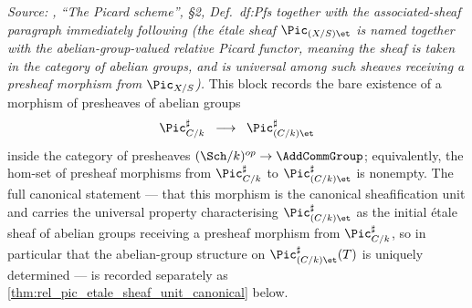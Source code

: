 \begin{theorem}\leanok
  \label{thm:rel_pic_etale_sheaf_group_structure}

  \textit{Source: \cite{kleiman-picard}, ``The Picard scheme'', \S 2,
  Def.~df:Pfs together with the associated-sheaf paragraph immediately
  following (the \'etale sheaf \(\Pic_{(X/S)\et}\) is named together with the
  abelian-group-valued relative Picard functor, meaning the sheaf is taken in
  the category of abelian groups, and is universal among such sheaves
  receiving a presheaf morphism from \(\Pic_{X/S}\)).}
  This block records the bare existence of a morphism of presheaves of
  abelian groups
  \[
    \Pic^\sharp_{C/k} \;\;\longrightarrow\;\;
    \Pic^\sharp_{(C/k)\et}
  \]
  inside the category of presheaves
  \((\Sch/k)^{op} \to \AddCommGroup\); equivalently, the hom-set of
  presheaf morphisms from \(\Pic^\sharp_{C/k}\) to
  \(\Pic^\sharp_{(C/k)\et}\) is nonempty. The full canonical statement
  --- that this morphism is the canonical sheafification unit and
  carries the universal property characterising
  \(\Pic^\sharp_{(C/k)\et}\) as the initial \'etale sheaf of abelian
  groups receiving a presheaf morphism from \(\Pic^\sharp_{C/k}\), so
  in particular that the abelian-group structure on
  \(\Pic^\sharp_{(C/k)\et}(T)\) is uniquely determined --- is recorded
  separately as \cref{thm:rel_pic_etale_sheaf_unit_canonical} below.
\end{theorem}

